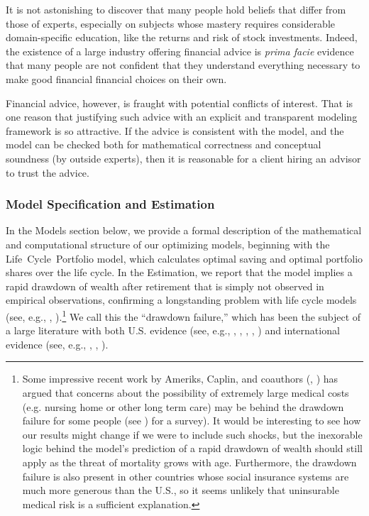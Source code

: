 \documentclass{article}
\begin{document}
It is not astonishing to discover that many people hold beliefs that differ from those of experts, especially on subjects whose mastery requires considerable domain-specific education, like the returns and risk of stock investments.
Indeed, the existence of a large industry offering financial advice is \textit{prima facie} evidence that many people are not confident that they understand everything necessary to make good financial financial choices on their own.

Financial advice, however, is fraught with potential conflicts of interest.
That is one reason that justifying such advice with an explicit and transparent modeling framework is so attractive.
If the advice is consistent with the model, and the model can be checked both for mathematical correctness and conceptual soundness (by outside experts), then it is reasonable for a client hiring an advisor to trust the advice.

\subsubsection{Model Specification and Estimation}

In the Models section below, we provide a formal description of the mathematical and computational structure of our optimizing models, beginning with the Life~Cycle~Portfolio model, which calculates optimal saving and optimal portfolio shares over the life cycle.
In the Estimation, we report that the model implies a rapid drawdown of wealth after retirement that is simply not observed in empirical observations, confirming a longstanding problem with life cycle models (see, e.g., \cite{hurd1987savings}, \cite{HEIMER_2019}).\footnote{Some impressive recent work by Ameriks, Caplin, and coauthors (\cite{ameriks2011joy}, \cite{Ameriks2020jpe}) has argued that concerns about the possibility of extremely large medical costs (e.g. nursing home or other long term care) may be behind the drawdown failure for some people (see \cite{DeNardi2016d}) for a survey).
It would be interesting to see how our results might change if we were to include such shocks, but the inexorable logic behind the model's prediction of a rapid drawdown of wealth should still apply as the threat of mortality grows with age.
Furthermore, the drawdown failure is also present in other countries whose social insurance systems are much more generous than the U.S., so it seems unlikely that uninsurable medical risk is a sufficient explanation.}
We call this the ``drawdown failure,'' which has been the subject of a large literature with both U.S. evidence (see, e.g., \cite{Hurd_1989}, \cite{DeNardi2016d}, \cite{Kopecky_2014}, \cite{Mortenson_2019}, \cite{Poterba_2018}) and international evidence (see, e.g., \cite{Christensen_2022}, \cite{Ventura_2020}, \cite{Niimi_2019}).
\end{document}
